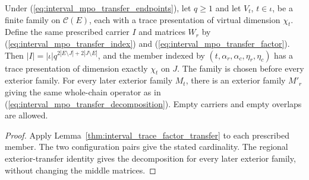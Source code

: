 \begin{lemma}
    \label{thm:interval_trace_common_family_transfer}
    \leanok
    Under (\ref{eq:interval_mpo_transfer_endpoints}), let $q\ge1$ and let
    $V_t$, $t\in\iota$, be a finite family on $\mathcal C(E)$, each with
    a trace presentation of virtual dimension $\chi_t$. Define the same
    prescribed carrier $I$ and matrices $W_r$ by
    (\ref{eq:interval_mpo_transfer_index}) and
    (\ref{eq:interval_mpo_transfer_factor}). Then
    $|I|=|\iota|q^{2|E\setminus J|+2|J\setminus E|}$, and the member
    indexed by $(t,\alpha_r,\alpha_c,\eta_r,\eta_c)$ has a trace
    presentation of dimension exactly $\chi_t$ on $J$.
    The family is chosen before every exterior family. For every later
    exterior family $M_t$, there is an exterior family $M'_r$ giving the
    same whole-chain operator as in
    (\ref{eq:interval_mpo_transfer_decomposition}). Empty carriers and
    empty overlaps are allowed.
\end{lemma}
\begin{proof}\leanok
    Apply Lemma~\ref{thm:interval_trace_factor_transfer} to each prescribed
    member. The two configuration pairs give the stated cardinality.
    The regional exterior-transfer identity gives the decomposition for
    every later exterior family, without changing the middle matrices.
\end{proof}
